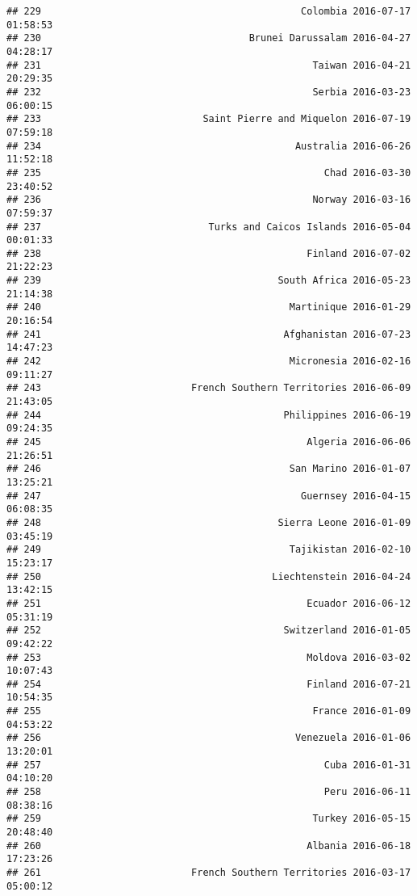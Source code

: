 \documentclass[
]{article}
\begin{document}
\begin{verbatim}
## 229                                             Colombia 2016-07-17 01:58:53
## 230                                    Brunei Darussalam 2016-04-27 04:28:17
## 231                                               Taiwan 2016-04-21 20:29:35
## 232                                               Serbia 2016-03-23 06:00:15
## 233                            Saint Pierre and Miquelon 2016-07-19 07:59:18
## 234                                            Australia 2016-06-26 11:52:18
## 235                                                 Chad 2016-03-30 23:40:52
## 236                                               Norway 2016-03-16 07:59:37
## 237                             Turks and Caicos Islands 2016-05-04 00:01:33
## 238                                              Finland 2016-07-02 21:22:23
## 239                                         South Africa 2016-05-23 21:14:38
## 240                                           Martinique 2016-01-29 20:16:54
## 241                                          Afghanistan 2016-07-23 14:47:23
## 242                                           Micronesia 2016-02-16 09:11:27
## 243                          French Southern Territories 2016-06-09 21:43:05
## 244                                          Philippines 2016-06-19 09:24:35
## 245                                              Algeria 2016-06-06 21:26:51
## 246                                           San Marino 2016-01-07 13:25:21
## 247                                             Guernsey 2016-04-15 06:08:35
## 248                                         Sierra Leone 2016-01-09 03:45:19
## 249                                           Tajikistan 2016-02-10 15:23:17
## 250                                        Liechtenstein 2016-04-24 13:42:15
## 251                                              Ecuador 2016-06-12 05:31:19
## 252                                          Switzerland 2016-01-05 09:42:22
## 253                                              Moldova 2016-03-02 10:07:43
## 254                                              Finland 2016-07-21 10:54:35
## 255                                               France 2016-01-09 04:53:22
## 256                                            Venezuela 2016-01-06 13:20:01
## 257                                                 Cuba 2016-01-31 04:10:20
## 258                                                 Peru 2016-06-11 08:38:16
## 259                                               Turkey 2016-05-15 20:48:40
## 260                                              Albania 2016-06-18 17:23:26
## 261                          French Southern Territories 2016-03-17 05:00:12

\end{verbatim}
\end{document}
